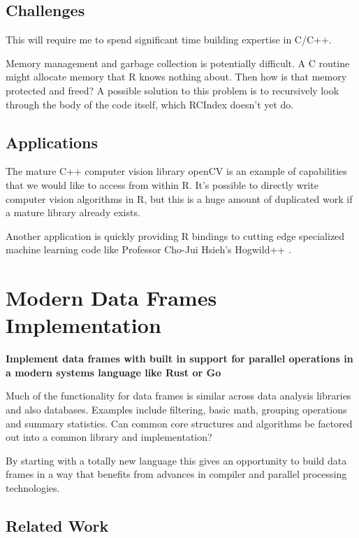 \documentclass[12pt]{article}
\begin{document}
\subsection{Challenges}

This will require me to spend significant time building expertise in C/C++.

Memory management and garbage collection is potentially difficult. A C
routine might allocate memory that R knows nothing about. Then how is that
memory protected and freed? A possible solution to this problem is to
recursively look
through the body of the code itself, which RCIndex doesn't yet do.

\subsection{Applications}

The mature C++ computer vision library openCV
\cite{opencv_library} is an example of capabilities that we would like to
access from within R. It's possible to directly write computer vision
algorithms in R, but this is a huge amount of duplicated work if a mature
library already exists.

Another application is quickly providing R bindings to cutting edge
specialized machine learning code like Professor Cho-Jui Hsieh's Hogwild++
\cite{zhang2016hogwild}.

\section{Modern Data Frames Implementation}

\textbf{Implement data frames with built in support for parallel operations
in a modern systems language like Rust or Go}

Much of the functionality for data frames is similar across data analysis
libraries and also databases. Examples include filtering, basic math,
grouping operations and summary statistics. Can common core structures
and algorithms be factored out into a common library and implementation?

By starting with a totally new language this gives an opportunity to build
data frames in a way that benefits from advances in compiler and
parallel processing technologies.

\subsection{Related Work}
\end{document}
